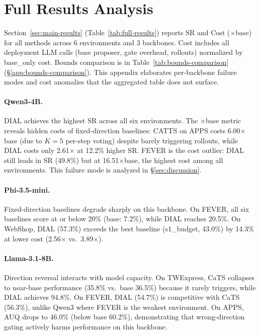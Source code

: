 \section{Full Results Analysis}
\label{app:full-results}

Section~\ref{sec:main-results} (Table~\ref{tab:full-results})
reports SR and Cost ($\times$base) for all methods across 6
environments and 3 backbones. Cost includes all deployment LLM
calls (base proposer, gate overhead, rollouts) normalized by
base\_only cost. Bounds comparison is in
Table~\ref{tab:bounds-comparison} (\S\ref{app:bounds-comparison}).
This appendix elaborates per-backbone failure modes and cost
anomalies that the aggregated table does not surface.

\paragraph{Qwen3-4B.} DIAL achieves the highest SR across all
six environments. The $\times$base metric reveals hidden costs
of fixed-direction baselines: CATTS on APPS costs
6.00$\times$base (due to $K{=}5$ per-step voting) despite
barely triggering rollouts, while DIAL costs only
2.61$\times$ at 12.2\% higher SR. FEVER is the cost outlier:
DIAL still leads in SR (49.8\%) but at 16.51$\times$base, the
highest cost among all environments. This failure mode is
analyzed in \S\ref{sec:discussion}.

\paragraph{Phi-3.5-mini.} Fixed-direction baselines degrade
sharply on this backbone. On FEVER, all six baselines score at or
below 20\% (base: 7.2\%), while DIAL reaches 20.5\%. On WebShop,
DIAL (57.3\%) exceeds the best baseline (s1\_budget, 43.0\%) by
14.3\% at lower cost (2.56$\times$ vs.\ 3.89$\times$).

\paragraph{Llama-3.1-8B.} Direction reversal interacts with model
capacity. On TWExpress, CaTS collapses to near-base performance
(35.8\% vs.\ base 36.5\%) because it rarely triggers, while DIAL
achieves 94.8\%. On FEVER, DIAL (54.7\%) is competitive with CaTS
(56.3\%), unlike Qwen3 where FEVER is the weakest environment.
On APPS, AUQ drops to
46.0\% (below base 60.2\%), demonstrating that wrong-direction
gating actively harms performance on this backbone.


